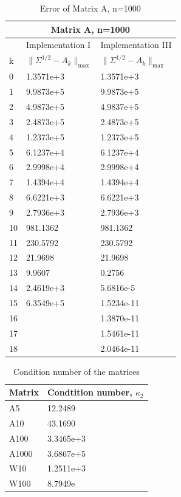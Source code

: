 \begin{table}
\begin{center}
\label{Table: A1000}
\begin{tabular}{| l | l | l | }

	\hline
	\multicolumn{3}{|c|}{Matrix A, n=1000}  \\
	\hline
	   & Implementation I & Implementation III \\
	k & $\parallel \Sigma^{1/2} - A_{k}\parallel_{\text{max}}$ & $\parallel \Sigma^{1/2} - A_{k}\parallel_{\text{max}}$  \\	
	\hline
	0 & 1.3571e+3 & 1.3571e+3\\
	1& 9.9873e+5 & 9.9873e+5 \\
	2 &  4.9873e+5& 4.9837e+5 \\
	3 & 2.4873e+5&  2.4873e+5\\
	4 & 1.2373e+5&  1.2373e+5  \\
	5 & 6.1237e+4& 6.1237e+4\\
	6 & 2.9998e+4& 2.9998e+4 \\
	7 & 1.4394e+4& 1.4394e+4 \\
	8 & 6.6221e+3& 6.6221e+3  \\
	9 & 2.7936e+3& 2.7936e+3 \\
	10 & 981.1362& 981.1362 \\
	11 & 230.5792& 230.5792 \\
	12& 21.9698& 21.9698\\ 
	13& 9.9607&0.2756\\
	14&2.4619e+3& 5.6816e-5 \\
	15&6.3549e+5& 1.5234e-11 \\
	16& & 1.3870e-11\\
	17& & 1.5461e-11\\
	18& & 2.0464e-11\\
	
	\hline
	
\end{tabular}
\caption{Error of Matrix A, n=1000}
\end{center}
\end{table}


\begin{table}
\begin{center}
\begin{tabular}{| l | l | }

	
	\hline
	Matrix & Condtition number, $\kappa_2$\\	
	\hline
	A5 & 12.2489  \\
	A10 & 43.1690 \\
	A100 &3.3465e+3  \\
	A1000 & 3.6867e+5 \\
	W10 & 1.2511e+3 \\
	W100 & 8.7949e \\
	
	\hline
	
\end{tabular}
\caption{Condition number of the matrices}
\label{tull}
\end{center}

\end{table}



